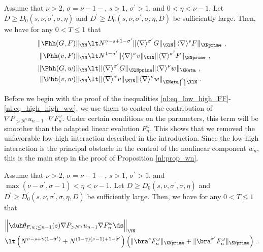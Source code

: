 \documentclass[11pt]{article}
\begin{document}
\begin{lem}\label{nl:lem_high_high}
Assume that \( \nu> 2 \), \( \sigma=\nu-1- \), \( s> 1 \), \( \sigma^\prime > 1 \), and \( 0 < \eta < \nu - 1 \).  Let \( D\geq D_0(s,\nu,\sigma^\prime,\sigma,\eta) \) and \( D^\prime\geq D_0^\prime(s,\nu,\sigma^\prime,\sigma,\eta,D) \) be sufficiently large. Then, we have for any \( 0 < T \leq 1 \) that  
\begin{align}
\| \Phh(G,F) \|_{\YN} &\lt N^{\nu-s+1-\sigma^\prime} \| \langle \nabla \rangle^{\sigma^\prime} G \|_{\SlN} \| \langle \nabla \rangle^s F \|_{\XNprime}~, \label{nl:eq_high_high_FF}\\
\| \Phh(v,F) \|_{\YN} &\lt N^{1-\sigma^\prime} \| \langle \nabla \rangle^{\nu} v \|_{\XlN} \| \langle \nabla \rangle^{\sigma^\prime} F \|_{\SNprime} ~, \label{nl:eq_high_high_wF} \\
\| \Phh(G,w) \|_{\YN} &\lt \| \langle \nabla \rangle^{\sigma^\prime} G \|_{\SlNprime} \| \langle \nabla\rangle^{\nu} w \|_{\XNeta}~, \label{nl:eq_high_high_Fw} \\
\| \Phh(v,w) \|_{\YN} &\lt \| \langle \nabla \rangle^{\sigma} v \|_{\SlN} \| \langle \nabla \rangle^{\nu} w \|_{\XNeta \bigcap \XlN} \label{nl:eq_high_high_ww}~.  
\end{align}
\end{lem}
Before we begin with the proof of the inequalities \eqref{nl:eq_low_high_FF}-\eqref{nl:eq_high_high_ww}, we use them to control the contribution of \( \nabla P_{>N^\gamma} u_{n-1} \cdot \nabla F_n^\omega \). Under certain conditions on the parameters, this term will be smoother than the adapted linear evolution \( F_n^\omega \). This shows that we removed the unfavorable low-high interaction described in the introduction. Since the low-high interaction is the principal obstacle in the control of the nonlinear component \( w_n \), this is the main step in the proof of Proposition \ref{nl:prop_wn}. 
\begin{cor}\label{nl:cor_inhomogeneous_contribution}
Assume that \( \nu> 2 \), \( \sigma=\nu-1- \), \( s> 1 \), \( \sigma^\prime > 1 \), and \( \max( \nu-\sigma^\prime, \sigma-1 ) < \eta < \nu - 1 \). Let \( D\geq D_0(s,\nu,\sigma^\prime,\sigma,\eta) \) and \( D^\prime\geq D_0^\prime(s,\nu,\sigma^\prime,\sigma,\eta,D) \) be sufficiently large. Then, we have for any \( 0 < T \leq 1 \) that  

\begin{equation}\label{nl:eq_inhomogeneous_contribution}
\begin{aligned}
&\Big\| \duh \theta_{F,w;\leq n-1}(s) \nabla P_{>N^\gamma} u_{n-1} \nabla F_n^\omega \ds \Big\|_{\YN} \\
&\lt \left( N^{\nu-s+\gamma(1-\sigma^\prime)} + N^{(1-\gamma) (\nu-1)+1-\sigma^\prime} \right) \left( \| \bra^s F_n^\omega \|_{\XNprime} + \| \bra^{\sigma^\prime} F_n^\omega \|_{\SNprime} \right)~. 
\end{aligned}
\end{equation}
\end{cor}
\end{document}
